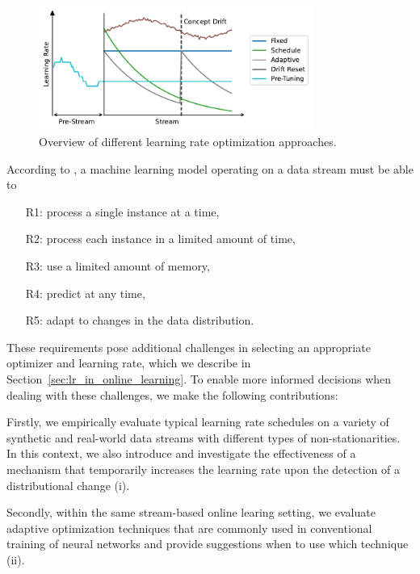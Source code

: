 \documentclass{article} %
\begin{document}
\begin{figure}[t]
   \centering
   \includegraphics[width=0.8\textwidth]{figures/lr_overview.pdf}
   \caption{Overview of different learning rate optimization approaches.}
   \label{fig:lr_overview}
\end{figure}
According to \citet{bifetMOAMassiveOnline2010}, a machine learning model operating on a data stream must be able to
\begin{enumerate}
   \item[R1:] process a single instance at a time,\label{rq:single_instance}
   \item[R2:] process each instance in a limited amount of time,\label{rq:limited_time}
   \item[R3:] use a limited amount of memory,\label{rq:limited_memory}
   \item[R4:] predict at any time,\label{rq:predict_any_time}
   \item[R5:] adapt to changes in the data distribution.\label{rq:adapt_to_drift}
\end{enumerate}

These requirements pose additional challenges in selecting an appropriate optimizer and learning rate, which we describe in Section~\ref{sec:lr_in_online_learning}.
To enable more informed decisions when dealing with these challenges, we make the following contributions:

Firstly, we empirically evaluate typical learning rate schedules on a variety of synthetic and real-world data streams with different types of non-stationarities.
In this context, we also introduce and investigate the effectiveness of a mechanism that temporarily increases the learning rate upon the detection of a distributional change (i).

Secondly, within the same stream-based online learing setting, we evaluate adaptive optimization techniques that are commonly used in conventional training of neural networks and provide suggestions when to use which technique (ii).
\end{document}
